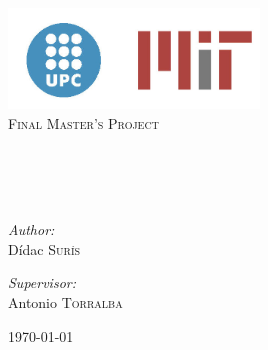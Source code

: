 \begin{titlepage}
\begin{center}

\includegraphics[width=0.5\textwidth]{figures/logos.jpg}~\\[1cm]


\textsc{\Large Final Master's Project}\\[0.5cm]

\HRule \\[0.4cm]
{ \huge \bfseries\myTitle \\[0.4cm] }

\HRule \\[1.5cm]

\begin{minipage}{0.4\textwidth}
\begin{flushleft} \large
\emph{Author:}\\
Dídac \textsc{Surís}
\end{flushleft}
\end{minipage}
\begin{minipage}{0.4\textwidth}
\begin{flushright} \large
\emph{Supervisor:} \\
Antonio \textsc{Torralba}
\end{flushright}
\end{minipage}

\vfill

{\large \today}

\end{center}
\end{titlepage}